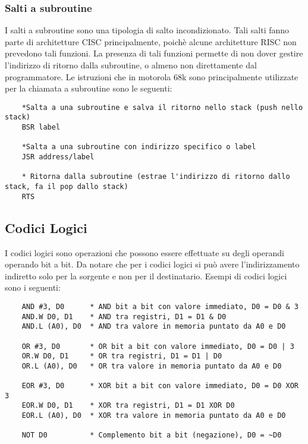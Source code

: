 \subsubsection{Salti a subroutine}
I salti a subroutine sono una tipologia di salto incondizionato. Tali salti fanno parte di architetture CISC principalmente, poichè alcune architetture RISC non prevedono tali funzioni. La presenza di tali funzioni permette di non dover gestire l'indirizzo di ritorno dalla subroutine, o almeno non direttamente dal programmatore. Le istruzioni che in motorola 68k sono principalmente utilizzate per la chiamata a subroutine sono le seguenti:
\begin{lstlisting}
    *Salta a una subroutine e salva il ritorno nello stack (push nello stack)
    BSR label

    *Salta a una subroutine con indirizzo specifico o label
    JSR address/label

    * Ritorna dalla subroutine (estrae l'indirizzo di ritorno dallo stack, fa il pop dallo stack)
    RTS
\end{lstlisting}

\subsection{Codici Logici}
I codici logici sono operazioni che possono essere effettuate su degli operandi operando bit a bit. Da notare che per i codici logici si può avere l'indirizzamento indiretto solo per la sorgente e non per il destinatario. Esempi di codici logici sono i seguenti:
\begin{lstlisting}
    AND #3, D0      * AND bit a bit con valore immediato, D0 = D0 & 3
    AND.W D0, D1    * AND tra registri, D1 = D1 & D0
    AND.L (A0), D0  * AND tra valore in memoria puntato da A0 e D0

    OR #3, D0       * OR bit a bit con valore immediato, D0 = D0 | 3
    OR.W D0, D1     * OR tra registri, D1 = D1 | D0
    OR.L (A0), D0   * OR tra valore in memoria puntato da A0 e D0

    EOR #3, D0      * XOR bit a bit con valore immediato, D0 = D0 XOR 3
    EOR.W D0, D1    * XOR tra registri, D1 = D1 XOR D0
    EOR.L (A0), D0  * XOR tra valore in memoria puntato da A0 e D0

    NOT D0          * Complemento bit a bit (negazione), D0 = ~D0
\end{lstlisting}

\newpage

